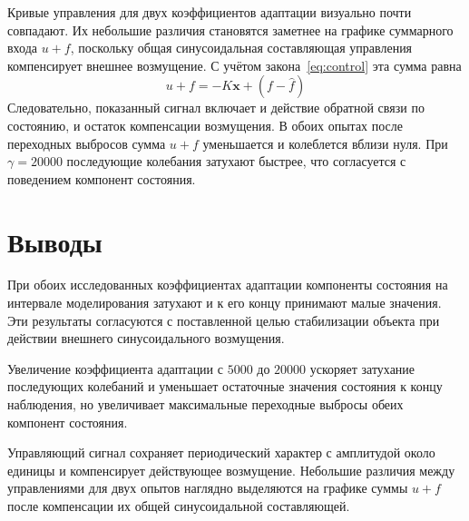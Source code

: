 Кривые управления для двух коэффициентов адаптации визуально почти
совпадают. Их небольшие различия становятся заметнее на графике
суммарного входа $u+f$, поскольку общая синусоидальная составляющая
управления компенсирует внешнее возмущение.
С учётом закона~\eqref{eq:control} эта сумма равна
\begin{equation}
  u+f=-K\bm x+(f-\hat f)
  \label{eq:plant-total-input}
\end{equation}
Следовательно, показанный сигнал включает и действие обратной связи
по состоянию, и остаток компенсации возмущения.
В обоих опытах после переходных выбросов сумма $u+f$ уменьшается
и колеблется вблизи нуля. При $\gamma=20000$ последующие колебания
затухают быстрее, что согласуется с поведением компонент состояния.

\section{Выводы}

При обоих исследованных коэффициентах адаптации компоненты состояния
на интервале моделирования затухают и к его концу принимают малые
значения. Эти результаты согласуются с поставленной целью стабилизации
объекта при действии внешнего синусоидального возмущения.

Увеличение коэффициента адаптации с $5000$ до $20000$ ускоряет затухание
последующих колебаний и уменьшает остаточные значения состояния
к концу наблюдения, но увеличивает максимальные переходные выбросы
обеих компонент состояния.

Управляющий сигнал сохраняет периодический характер с амплитудой
около единицы и компенсирует действующее возмущение.
Небольшие различия между управлениями для двух опытов наглядно
выделяются на графике суммы $u+f$ после компенсации их общей
синусоидальной составляющей.
